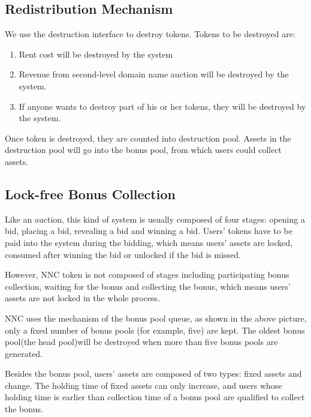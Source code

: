 \documentclass[letterpaper,10pt,english]{sphinxmanual}
\begin{document}
\subsection{Redistribution Mechanism}
\label{\detokenize{nns_protocol:redistribution-mechanism}}
We use the destruction interface to destroy tokens. Tokens to be destroyed are:
\begin{enumerate}
\item {} 
Rent cost will be destroyed by the system

\item {} 
Revenue from second-level domain name auction will be destroyed by the system.

\item {} 
If anyone wants to destroy part of his or her tokens, they will be destroyed by the system.

\end{enumerate}

Once token is destroyed, they are counted into destruction pool. Assets in the destruction pool will go into the bonus pool, from which users could collect assets.


\subsection{Lock-free Bonus Collection}
\label{\detokenize{nns_protocol:lock-free-bonus-collection}}
Like an auction, this kind of system is usually composed of four stages: opening a bid, placing a bid, revealing a bid and winning a bid.
Users’ tokens have to be paid into the system during the bidding, which means users’ assets are locked,
consumed after winning the bid or unlocked if the bid is missed.

However, NNC token is not composed of stages including participating bonus collection, waiting for the bonus and collecting the bonus,
which means users’ assets are not locked in the whole process.

NNC uses the mechanism of the bonus pool queue, as shown in the above picture, only a fixed number of bonus pools (for example, five) are kept.
The oldest bonus pool(the head pool)will be destroyed when more than five bonus pools are generated.

Besides the bonus pool, users’ assets are composed of two types: fixed assets and change. The holding time of fixed assets can only increase, and users whose holding time is earlier than collection time of a bonus pool are qualified to collect the bonus.
\end{document}
